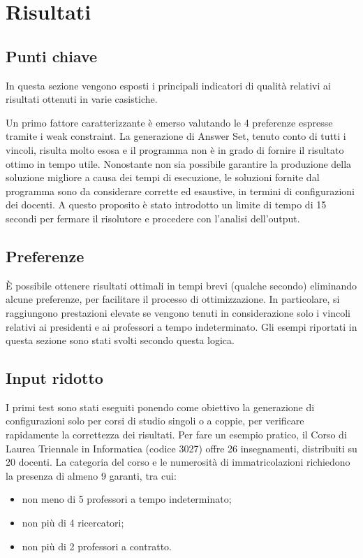\section{Risultati}

\subsection{Punti chiave}
In questa sezione vengono esposti i principali indicatori di qualità 
relativi ai risultati ottenuti in varie casistiche.

Un primo fattore caratterizzante è emerso valutando le 4 preferenze espresse 
tramite i weak constraint. La generazione di Answer Set,
tenuto conto di tutti i vincoli, risulta molto esosa e il programma non è 
in grado di fornire il risultato ottimo in tempo utile.
Nonostante non sia possibile garantire la produzione della soluzione migliore a causa
dei tempi di esecuzione, le soluzioni fornite dal programma sono da considerare 
corrette ed esaustive, in termini di configurazioni dei docenti.
A questo proposito è stato introdotto un limite di tempo di 15 secondi per 
fermare il risolutore e procedere con l'analisi dell'output.

\subsection{Preferenze}
È possibile ottenere risultati ottimali in tempi brevi (qualche secondo) eliminando alcune 
preferenze, per facilitare il processo di ottimizzazione. In particolare, si raggiungono
prestazioni elevate se vengono tenuti in considerazione solo i vincoli relativi ai 
presidenti e ai professori a tempo indeterminato.
Gli esempi riportati in questa sezione sono stati svolti secondo questa logica.

\subsection{Input ridotto}
I primi test sono stati eseguiti ponendo come obiettivo la generazione di 
configurazioni solo per corsi di studio singoli o a coppie, per verificare 
rapidamente la correttezza dei risultati.
Per fare un esempio pratico, il Corso di Laurea Triennale in Informatica (codice 3027)
offre 26 insegnamenti, distribuiti su 20 docenti.
La categoria del corso e le numerosità di immatricolazioni richiedono 
la presenza di almeno 9 garanti, tra cui:
\begin{itemize}
    \item non meno di 5 professori a tempo indeterminato;
    \item non più di 4 ricercatori;
    \item non più di 2 professori a contratto.
\end{itemize}


